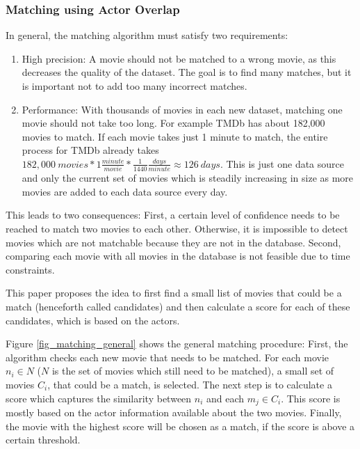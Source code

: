 \subsubsection{Matching using Actor Overlap}
In general, the matching algorithm must satisfy two requirements:
\begin{enumerate}
	\item{High precision:} A movie should not be matched to a wrong movie, as this decreases the quality of the dataset.
	The goal is to find many matches, but it is important not to add too many incorrect matches.
	\item{Performance:} With thousands of movies in each new dataset, matching one movie should not take too long.
	For example TMDb has about 182,000 movies to match.
	If each movie takes just 1 minute to match, the entire process for TMDb already takes $182,000~movies * 1 \frac{minute}{movie} * \frac{1}{1440} \frac{days}{minute} \approx 126~days$.
	This is just one data source and only the current set of movies which is steadily increasing in size as more movies are added to each data source every day.
\end{enumerate}

This leads to two consequences: First, a certain level of confidence needs to be reached to match two movies to each other.
Otherwise, it is impossible to detect movies which are not matchable because they are not in the database.
Second, comparing each movie with all movies in the database is not feasible due to time constraints.

This paper proposes the idea to first find a small list of movies that could be a match (henceforth called candidates) and then calculate a score for each of these candidates, which is based on the actors.

Figure \ref{fig_matching_general} shows the general matching procedure:
First, the algorithm checks each new movie that needs to be matched.
For each movie $n_i \in N$ ($N$ is the set of movies which still need to be matched), a small set of movies $C_{i}$, that could be a match, is selected.
The next step is to calculate a score which captures the similarity between $n_i$ and each $m_j \in C_i$.
This score is mostly based on the actor information available about the two movies.
Finally, the movie with the highest score will be chosen as a match, if the score is above a certain threshold.

